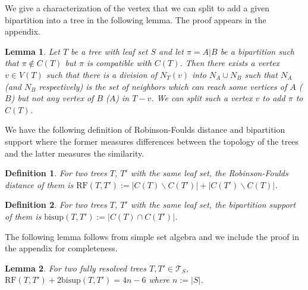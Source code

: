 \documentclass{bmcart}
\newcommand{\bs}{\mathrm{bisup}}
\newcommand{\RF}{\mathrm{RF}}
\newcommand{\bisuptwo}{\textsc{Bisup-Supertree-$2$}\xspace}
\DeclareMathOperator*{\argmax}{argmax}
\newtheorem{lemma}{Lemma}
\newtheorem{definition}{Definition}
\begin{document}
We give a characterization of the vertex that we can split to add a given bipartition into a tree in the following lemma. The proof appears in the appendix. 
\begin{lemma} \label{lem:vertex_to_split}
    Let $T$ be a tree with leaf set $S$ and let $\pi = A|B$ be a bipartition such that $\pi \notin C(T)$ but $\pi$ is compatible with $C(T)$. Then there exists a vertex $v \in V(T)$ such that there is a division of $N_T(v)$ into $N_A \cup N_B$ such that $N_A$ (and $N_B$ respectively) is the set of neighbors which can reach some vertices of $A$ ($B$) but not any vertex of $B$ ($A$) in $T-v$. We can split such a vertex $v$ to add $\pi$ to $C(T)$.
\end{lemma}

We have the following definition of Robinson-Foulds distance and bipartition support where the former measures differences between the topology of the trees and the latter measures the similarity.
\begin{definition}
For two trees $T$, $T'$ with the same leaf set, the \textit{Robinson-Foulds distance} of them is $\RF(T, T') := |C(T)\backslash C(T')| + |C(T') \backslash C(T)|$.
\end{definition}

\begin{definition}
For two trees $T$, $T'$ with the same leaf set, the \textit{bipartition support} of them is $\bs(T, T') := |C(T) \cap C(T')|$.
\end{definition}

The following lemma follows from simple set algebra and we include the proof in the appendix for completeness.
\begin{lemma}\label{lem:sum_RF_support}
For two fully resolved trees $T,T' \in \mathcal{T}_S$, $\RF(T,T')+2\bs(T,T') = 4n - 6$ where $n := |S|$.
\end{lemma}

\end{document}
